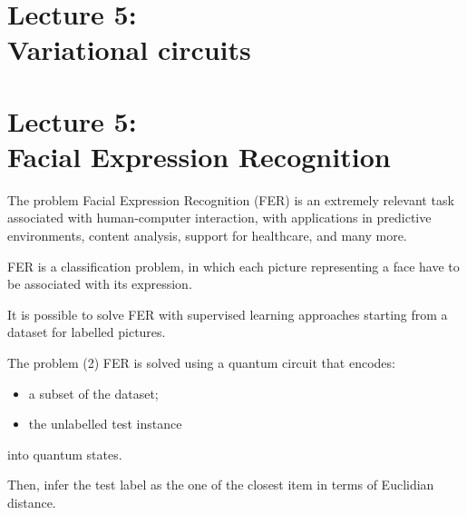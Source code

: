 \section{Lecture 5:\\ Variational circuits}
\SectionPage{}



\section{Lecture 5:\\ Facial Expression Recognition}
\SectionPage{}

\begin{frame}{The problem}
Facial Expression Recognition (FER) is an extremely relevant task associated with human-computer interaction, with applications in predictive environments, content analysis, support for healthcare, and many more. 

\bigskip FER is a classification problem, in which each picture representing a face have to be associated with its expression.

\bigskip It is possible to solve FER with supervised learning approaches starting from a dataset for labelled pictures.
\end{frame}



\begin{frame}{The problem (2)}
FER is solved using a quantum circuit that encodes:
\begin{itemize}
    \item a subset of the dataset;
    \item the unlabelled test instance
\end{itemize} 
into quantum states.

\bigskip Then, infer the test label as the one of the closest item in terms of Euclidian distance.
\end{frame}






